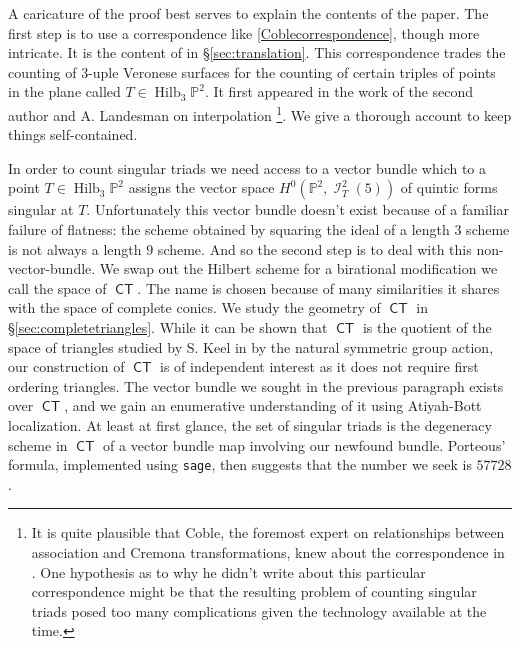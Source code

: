 \documentclass{article}
\renewcommand{\P}{\mathbb{P}}
\DeclareMathOperator{\Hilb}{Hilb}
\DeclareMathOperator{\I}{\mathcal{I}}
\DeclareMathOperator{\CT}{\mathsf{CT}}
\begin{document}
A caricature of the proof best serves to explain the contents of the paper.  The first step is to use a correspondence like \eqref{Coblecorrespondence}, though more intricate. It is the content of  in \S \ref{sec:translation}.  This correspondence trades the counting of $3$-uple Veronese surfaces for the counting of certain triples of points in the plane called  $T \in \Hilb_{3}\P^{2}$.  It first appeared in the work of the second author and A. Landesman \cite{landesman2019interpolation} on interpolation \footnote{It is quite plausible that Coble, the foremost expert on relationships between  association and Cremona transformations, knew about the correspondence in .  One hypothesis as to why he didn't write about this particular correspondence might be that the resulting problem of counting singular triads posed too many complications given the technology available at the time.}.  We give a thorough account to keep things self-contained.  

In order to count singular triads we need access to a vector bundle which to a point $T \in \Hilb_{3}\P^{2}$ assigns the vector space $H^{0}(\P^{2},\I^{2}_{T}(5))$ of quintic forms singular at $T$.  Unfortunately this vector bundle doesn't exist because of a familiar failure of flatness: the scheme obtained by squaring the ideal of a length $3$ scheme is not always a length $9$ scheme.  And so the second step is to deal with this non-vector-bundle. We swap out the Hilbert scheme for a birational modification we call the space of  $\CT$. The name is chosen because of many similarities it shares with the space of complete conics.  We study the geometry of $\CT$ in \S \ref{sec:completetriangles}.  While it can be shown that $\CT$ is the quotient of the space of  triangles studied by S. Keel in \cite{keel1993functorial} by the natural symmetric group action, our construction of $\CT$ is of independent interest as it does not require first ordering triangles. The vector bundle we sought in the previous paragraph exists over $\CT$, and we gain an enumerative understanding of it using Atiyah-Bott localization.  At least at first glance, the set of singular triads is the degeneracy scheme in $\CT$ of a vector bundle map involving our newfound bundle. Porteous' formula, implemented using \texttt{sage}, then suggests that the number we seek is $57728$.  
\end{document}
